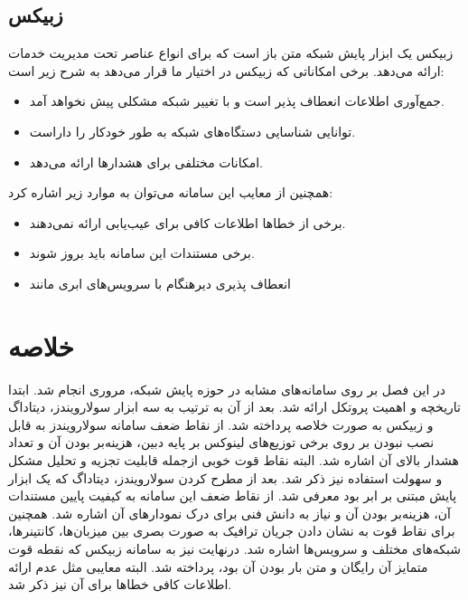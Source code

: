 \subsection{زبیکس}

زبیکس یک ابزار پایش شبکه متن باز است که برای انواع عناصر تحت مدیریت خدمات ارائه می‌دهد. برخی امکاناتی که زبیکس در اختیار ما قرار می‌دهد به شرح زیر است\cite{olups2010zabbix}:

\begin{itemize}
    \item جمع‌آوری اطلاعات انعطاف پذیر است و با تغییر شبکه مشکلی پیش نخواهد آمد.
    \item توانایی شناسایی دستگاه‌های شبکه به طور خودکار را داراست.
    \item امکانات مختلفی برای هشدارها ارائه می‌دهد.
\end{itemize}
\newpage
همچنین از معایب این سامانه می‌توان به موارد زیر اشاره کرد:

\begin{itemize}
    \item برخی از خطاها اطلاعات کافی برای عیب‌یابی ارائه نمی‌دهند.
    \item برخی مستندات این سامانه باید بروز شوند.
    \item انعطاف پذیری دیرهنگام با سرویس‌های ابری مانند 
\end{itemize}

\section{خلاصه}

در این فصل بر روی سامانه‌های مشابه در حوزه پایش شبکه، مروری انجام شد. ابتدا تاریخچه‌ و اهمیت پروتکل  ارائه شد. بعد از آن به ترتیب به سه ابزار سولارویندز، دیتاداگ و زبیکس به صورت خلاصه پرداخته شد. از نقاط ضعف سامانه سولارویندز به قابل نصب نبودن بر روی برخی توزیع‌های لینوکس بر پایه دبین، هزینه‌بر بودن آن و تعداد هشدار بالای آن اشاره شد. البته نقاط قوت خوبی ازجمله قابلیت تجزیه و تحلیل مشکل و سهولت استفاده نیز ذکر شد. بعد از مطرح کردن سولارویندز، دیتاداگ که یک ابزار پایش مبتنی بر ابر بود معرفی شد. از نقاط ضعف این سامانه به کیفیت پایین مستندات آن، هزینه‌بر بودن آن و نیاز به دانش فنی برای درک نمودارهای آن اشاره شد. همچنین برای نقاط قوت به نشان دادن جریان ترافیک به صورت بصری بین میزبان‌ها، کانتینرها، شبکه‌های مختلف و سرویس‌ها اشاره شد. درنهایت نیز به سامانه زبیکس که نقطه قوت متمایز آن رایگان و متن بار بودن آن بود، پرداخته شد. البته معایبی مثل عدم ارائه اطلاعات کافی خطاها برای آن نیز ذکر شد.
